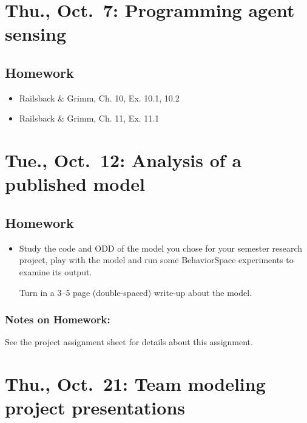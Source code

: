 \documentclass[
]{article}
\providecommand{\tightlist}{%
  \setlength{\itemsep}{0pt}\setlength{\parskip}{0pt}}
\begin{document}
\hypertarget{thu.-oct.-7-programming-agent-sensing}{%
\section{Thu., Oct.~7: Programming agent
sensing}\label{thu.-oct.-7-programming-agent-sensing}}

\hypertarget{homework-9}{%
\subsection{Homework}\label{homework-9}}

\begin{itemize}
\tightlist
\item
  Railsback \& Grimm, Ch. 10, Ex. 10.1, 10.2
\item
  Railsback \& Grimm, Ch. 11, Ex. 11.1
\end{itemize}

\hypertarget{tue.-oct.-12-analysis-of-a-published-model}{%
\section{Tue., Oct.~12: Analysis of a published
model}\label{tue.-oct.-12-analysis-of-a-published-model}}

\hypertarget{homework-10}{%
\subsection{Homework}\label{homework-10}}

\begin{itemize}
\item
  Study the code and ODD of the model you chose for your semester
  research project, play with the model and run some BehaviorSpace
  experiments to examine its output.

  Turn in a 3--5 page (double-spaced) write-up about the model.
\end{itemize}

\hypertarget{notes-on-homework-6}{%
\subsubsection{Notes on Homework:}\label{notes-on-homework-6}}

See the project assignment sheet for details about this assignment.

\hypertarget{thu.-oct.-21-team-modeling-project-presentations}{%
\section{Thu., Oct.~21: Team modeling project
presentations}\label{thu.-oct.-21-team-modeling-project-presentations}}
\end{document}
